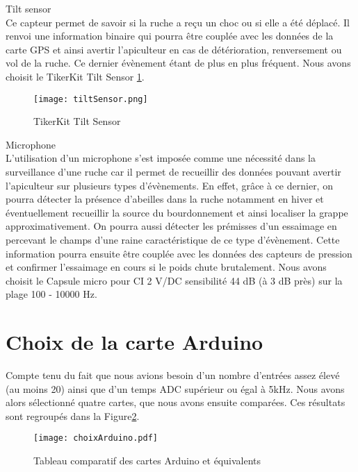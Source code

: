 Tilt sensor\\

Ce capteur permet de savoir si la ruche a reçu un choc ou si elle a été déplacé. Il renvoi une information binaire qui pourra être couplée avec les données de la carte GPS et ainsi avertir l'apiculteur en cas de détérioration, renversement ou vol de la ruche. Ce dernier évènement étant de plus en plus fréquent.
Nous avons choisit le TikerKit Tilt Sensor \ref{fig:tiltSensor}.\\

\begin{figure}[h]
\centering\texttt{[image: tiltSensor.png]}
\caption{\label{fig:tiltSensor} TikerKit Tilt Sensor}
\end{figure} 
     

Microphone\\

L'utilisation d'un microphone s'est imposée comme une nécessité dans la surveillance d'une ruche car il permet de recueillir des données pouvant avertir l'apiculteur sur plusieurs types d'évènements. En effet, grâce à ce dernier, on pourra détecter la présence d'abeilles dans la ruche notamment en hiver et éventuellement recueillir la source du bourdonnement et ainsi localiser la grappe approximativement. On pourra aussi détecter les prémisses d'un essaimage en percevant le champs d'une raine caractéristique de ce type d'évènement. Cette information pourra ensuite être couplée avec les données des capteurs de pression et confirmer l'essaimage en cours si le poids chute brutalement. 
Nous avons choisit le Capsule micro pour CI 2 V/DC sensibilité 44 dB (à 3 dB près) sur la plage 100 - 10000 Hz. 

\section{Choix de la carte Arduino}
\vspace{1.5cm}

Compte tenu du fait que nous avions besoin d'un nombre d'entrées assez élevé (au moins 20) ainsi que d'un temps ADC supérieur ou égal à 5kHz. Nous avons alors sélectionné quatre cartes, que nous avons ensuite comparées. Ces résultats sont regroupés dans la Figure\ref{fig:choixardui}.

\begin{figure}[h]
\centering\texttt{[image: choixArduino.pdf]}
\caption{\label{fig:choixardui} Tableau comparatif des cartes Arduino et équivalents}
\end{figure} 

